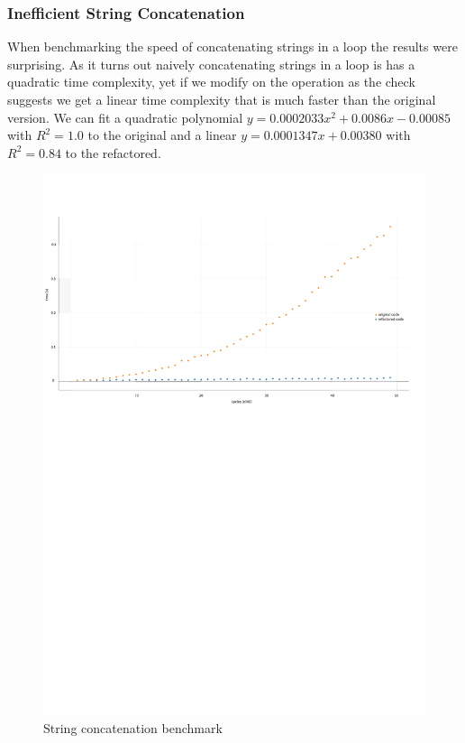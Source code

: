 \subsubsection{Inefficient String Concatenation}
\par When benchmarking the speed of concatenating strings in a loop the results were surprising. As it turns out naively concatenating strings in a loop is has a quadratic time complexity, yet if we modify on the operation as the check suggests we get a linear time complexity that is much faster than the original version. We can fit a quadratic polynomial $y=0.0002033x^2+0.0086x-0.00085$ with $R^2=1.0$ to the original and a linear $y=0.0001347x+0.00380$ with $R^2=0.84$ to the refactored.
\begin{figure}
	\caption{String concatenation benchmark}
	\includegraphics[scale=0.7]{images/string_concat.pdf}
\end{figure}

